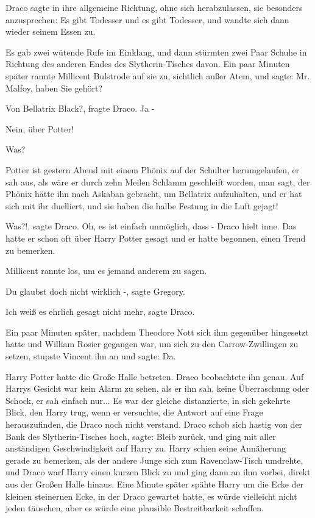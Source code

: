 Draco sagte in ihre allgemeine Richtung, ohne sich herabzulassen, sie besonders
anzusprechen: \glqq{}Es gibt Todesser und es gibt Todesser\grqq{}, und wandte
sich dann wieder seinem Essen zu.

Es gab zwei wütende Rufe im Einklang, und dann stürmten zwei Paar Schuhe in
Richtung des anderen Endes des Slytherin-Tisches davon. Ein paar Minuten später
rannte Millicent Bulstrode auf sie zu, sichtlich außer Atem, und sagte: \glqq
Mr. Malfoy, haben Sie gehört?\grqq{}

\glqq{}Von Bellatrix Black?\grqq{}, fragte Draco. \glqq{}Ja -\grqq{}

\glqq{}Nein, über Potter!\grqq{}

\glqq{}Was?\grqq{}

\glqq{}Potter ist gestern Abend mit einem Phönix auf der Schulter herumgelaufen,
er sah aus, als wäre er durch zehn Meilen Schlamm geschleift worden, man sagt,
der Phönix hätte ihn nach Askaban gebracht, um Bellatrix aufzuhalten, und er hat
sich mit ihr duelliert, und sie haben die halbe Festung in die Luft
gejagt!\grqq{}

\glqq{}Was?!\grqq{}, sagte Draco. \glqq{}Oh, es ist einfach unmöglich, dass
-\grqq{} Draco hielt inne. Das hatte er schon oft über Harry Potter gesagt und
er hatte begonnen, einen Trend zu bemerken.

Millicent rannte los, um es jemand anderem zu sagen.

\glqq{}Du glaubst doch nicht wirklich -\grqq{}, sagte Gregory.

\glqq{}Ich weiß es ehrlich gesagt nicht mehr\grqq{}, sagte Draco.

Ein paar Minuten später, nachdem Theodore Nott sich ihm gegenüber hingesetzt
hatte und William Rosier gegangen war, um sich zu den Carrow-Zwillingen zu
setzen, stupste Vincent ihn an und sagte: \glqq{}Da.\grqq{}

Harry Potter hatte die Große Halle betreten. Draco beobachtete ihn genau. Auf
Harrys Gesicht war kein Alarm zu sehen, als er ihn sah, keine Überraschung oder
Schock, er sah einfach nur... Es war der gleiche distanzierte, in sich gekehrte
Blick, den Harry trug, wenn er versuchte, die Antwort auf eine Frage
herauszufinden, die Draco noch nicht verstand. Draco schob sich hastig von der
Bank des Slytherin-Tisches hoch, sagte: \glqq{}Bleib zurück\grqq{}, und ging mit
aller anständigen Geschwindigkeit auf Harry zu. Harry schien seine Annäherung
gerade zu bemerken, als der andere Junge sich zum Ravenclaw-Tisch umdrehte, und
Draco warf Harry einen kurzen Blick zu und ging dann an ihm vorbei, direkt aus
der Großen Halle hinaus. Eine Minute später spähte Harry um die Ecke der kleinen
steinernen Ecke, in der Draco gewartet hatte, es würde vielleicht nicht jeden
täuschen, aber es würde eine plausible Bestreitbarkeit schaffen.

